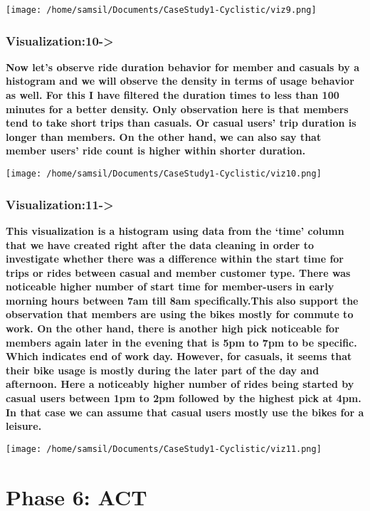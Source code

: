 \documentclass[
]{article}
\begin{document}
\texttt{[image: /home/samsil/Documents/CaseStudy1-Cyclistic/viz9.png]}

\hypertarget{visualization10-}{%
\subsubsection{\texorpdfstring{\textbf{Visualization:10-\textgreater{}}}{Visualization:10-\textgreater{}}}\label{visualization10-}}

\textbf{Now let's observe ride duration behavior for member and casuals
by a histogram and we will observe the density in terms of usage
behavior as well. For this I have filtered the duration times to less
than 100 minutes for a better density. Only observation here is that
members tend to take short trips than casuals. Or casual users' trip
duration is longer than members. On the other hand, we can also say that
member users' ride count is higher within shorter duration.}

\texttt{[image: /home/samsil/Documents/CaseStudy1-Cyclistic/viz10.png]}

\hypertarget{visualization11-}{%
\subsubsection{\texorpdfstring{\textbf{Visualization:11-\textgreater{}}}{Visualization:11-\textgreater{}}}\label{visualization11-}}

\textbf{This visualization is a histogram using data from the `time'
column that we have created right after the data cleaning in order to
investigate whether there was a difference within the start time for
trips or rides between casual and member customer type. There was
noticeable higher number of start time for member-users in early morning
hours between 7am till 8am specifically.This also support the
observation that members are using the bikes mostly for commute to work.
On the other hand, there is another high pick noticeable for members
again later in the evening that is 5pm to 7pm to be specific. Which
indicates end of work day. However, for casuals, it seems that their
bike usage is mostly during the later part of the day and afternoon.
Here a noticeably higher number of rides being started by casual users
between 1pm to 2pm followed by the highest pick at 4pm. In that case we
can assume that casual users mostly use the bikes for a leisure.}

\texttt{[image: /home/samsil/Documents/CaseStudy1-Cyclistic/viz11.png]}

\hypertarget{phase-6-act}{%
\section{\texorpdfstring{\textbf{Phase 6:
ACT}}{Phase 6: ACT}}\label{phase-6-act}}
\end{document}
